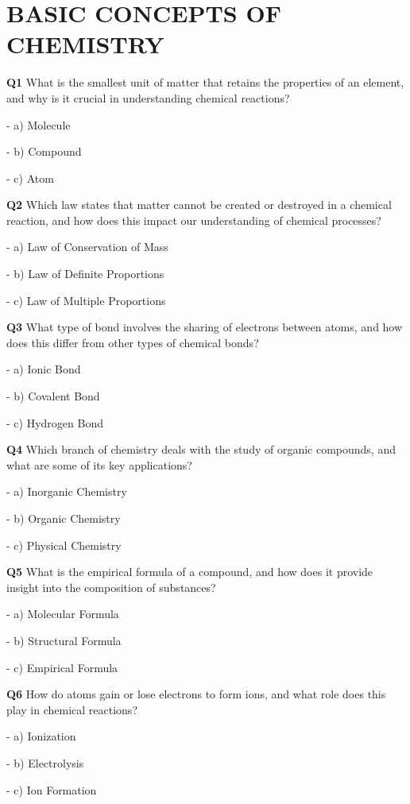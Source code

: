 \section{BASIC CONCEPTS OF CHEMISTRY}

\textbf{Q1} What is the smallest unit of matter that retains the properties of an element, and why is it crucial in understanding chemical reactions?\par
\quad - a) Molecule\par
\quad - b) Compound\par
\quad - c) Atom\par

\textbf{Q2} Which law states that matter cannot be created or destroyed in a chemical reaction, and how does this impact our understanding of chemical processes?\par
\quad - a) Law of Conservation of Mass\par
\quad - b) Law of Definite Proportions\par
\quad - c) Law of Multiple Proportions\par

\textbf{Q3} What type of bond involves the sharing of electrons between atoms, and how does this differ from other types of chemical bonds?\par
\quad - a) Ionic Bond\par
\quad - b) Covalent Bond\par
\quad - c) Hydrogen Bond\par

\textbf{Q4} Which branch of chemistry deals with the study of organic compounds, and what are some of its key applications?\par
\quad - a) Inorganic Chemistry\par
\quad - b) Organic Chemistry\par
\quad - c) Physical Chemistry\par

\textbf{Q5} What is the empirical formula of a compound, and how does it provide insight into the composition of substances?\par
\quad - a) Molecular Formula\par
\quad - b) Structural Formula\par
\quad - c) Empirical Formula\par

\textbf{Q6} How do atoms gain or lose electrons to form ions, and what role does this play in chemical reactions?\par
\quad - a) Ionization\par
\quad - b) Electrolysis\par
\quad - c) Ion Formation\par


